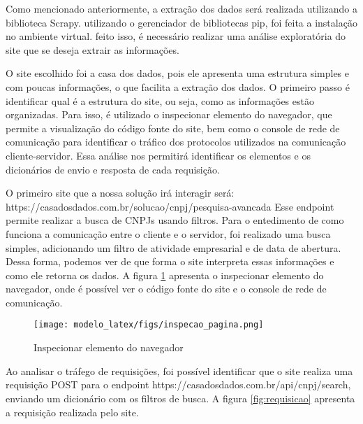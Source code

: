 Como mencionado anteriormente, a extração dos dados será realizada utilizando a biblioteca Scrapy. utilizando o gerenciador de bibliotecas pip, foi feita a instalação no ambiente virtual. feito isso, é necessário realizar uma análise exploratória do site que se deseja extrair as informações.

O site escolhido foi a casa dos dados, pois ele apresenta uma estrutura simples e com poucas informações, o que facilita a extração dos dados. O primeiro passo é identificar qual é a estrutura do site, ou seja, como as informações estão organizadas. Para isso, é utilizado o inspecionar elemento do navegador, que permite a visualização do código fonte do site, bem como o console de rede de comunicação para identificar o tráfico dos protocolos utilizados na comunicação cliente-servidor. Essa análise nos permitirá identificar os elementos e os dicionários de envio e resposta de cada requisição.

O primeiro site que a nossa solução irá interagir será:
https://casadosdados.com.br/solucao/cnpj/pesquisa-avancada
Esse endpoint permite realizar a busca de CNPJs usando filtros. Para o entedimento de como funciona a comunicação entre o cliente e o servidor, foi realizado uma busca simples, adicionando um filtro de atividade empresarial e de data de abertura. Dessa forma, podemos ver de que forma o site interpreta essas informações e como ele retorna os dados. A figura \ref{fig:inspecao_pagina} apresenta o inspecionar elemento do navegador, onde é possível ver o código fonte do site e o console de rede de comunicação.

\begin{figure}[H]
    \centering
    \texttt{[image: modelo\_latex/figs/inspecao\_pagina.png]}
    \caption{Inspecionar elemento do navegador}
    \label{fig:inspecao_pagina}

\end{figure}

Ao analisar o tráfego de requisições, foi possível identificar que o site realiza uma requisição POST para o endpoint https://casadosdados.com.br/api/cnpj/search, enviando um dicionário com os filtros de busca. A figura \ref{fig:requisicao} apresenta a requisição realizada pelo site.